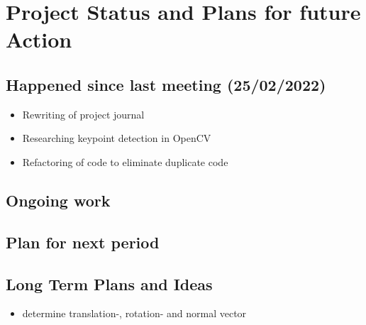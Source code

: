 \chapter{Project Status and Plans for future Action}

\section{Happened since last meeting (25/02/2022)}
\begin{itemize}
    \item Rewriting of project journal
    \item Researching keypoint detection in OpenCV
    \item Refactoring of code to eliminate duplicate code
\end{itemize}
\section{Ongoing work}

\section{Plan for next period}

\section{Long Term Plans and Ideas}
\begin{itemize}
    \item determine translation-, rotation- and normal vector
\end{itemize}
